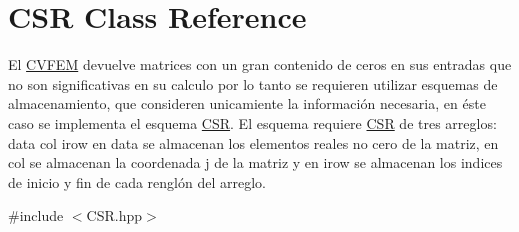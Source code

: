 \hypertarget{class_c_s_r}{}\section{C\+SR Class Reference}
\label{class_c_s_r}


El \hyperlink{class_c_v_f_e_m}{C\+V\+F\+EM} devuelve matrices con un gran contenido de ceros en sus entradas que no son significativas en su calculo por lo tanto se requieren utilizar esquemas de almacenamiento, que consideren unicamiente la información necesaria, en éste caso se implementa el esquema \hyperlink{class_c_s_r}{C\+SR}. El esquema requiere \hyperlink{class_c_s_r}{C\+SR} de tres arreglos\+: data col irow en data se almacenan los elementos reales no cero de la matriz, en col se almacenan la coordenada j de la matriz y en irow se almacenan los indices de inicio y fin de cada renglón del arreglo.  




{\ttfamily \#include $<$C\+S\+R.\+hpp$>$}

